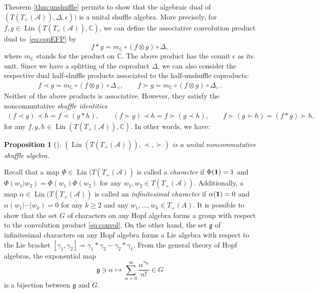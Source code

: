 \documentclass[11pt]{article}
\numberwithin{equation}{section}
\numberwithin{equation}{section}
\newtheorem{Proposition}[Theorem]{Proposition}
 { \theoremstyle{definition}
\newtheorem{Definition}[Theorem]{Definition}
\newtheorem{Example}[Theorem]{Example}
\newtheorem{Remark}[Theorem]{Remark} }
\newcommand{\g}{\mathfrak{g}}
\newcommand{\A}{\mathcal{A}}
\newcommand{\uno}{{\bf{1}}}
\begin{document}
Theorem \ref{thm:unshuffle} permits to show that the algebraic dual of $(T(T_+(\A)),\Delta,\epsilon))$ is a unital shuffle algebra. More precisely, for $f,g\in \operatorname{Lin}(T(T_+(\A)),\mathbb{C})$, we can define the associative convolution product dual to~\eqref{eq:copEFP} by
\begin{equation}\label{eq:convol}
	f*g = m_{\mathbb{C}}\circ (f\otimes g)\circ \Delta,
\end{equation}
where $m_{\mathbb{C}}$ stands for the product on $\mathbb{C}$. The above product has the counit $\epsilon$ as its unit. Since we have a splitting of the coproduct $\Delta$, we can also consider the respective dual half-shuffle products associated to the half-unshuffle coproducts:
\begin{gather*}
	f\prec g
	= m_{\mathbb{C}}\circ (f\otimes g)\circ \Delta_{\prec},\qquad
	f\succ g
	= m_{\mathbb{C}}\circ (f\otimes g)\circ \Delta_{\succ}.
\end{gather*}
Neither of the above products is associative. However, they satisfy the noncommutative \textit{shuffle identities}
\begin{gather*}
	(f\prec g)\prec h =f\prec (g*h),\qquad\!
	(f\succ g)\prec h = f\succ (g\prec h),\qquad\!
	f\succ (g\succ h) = (f*g)\succ h,
\end{gather*}
for any $f,g,h\in \operatorname{Lin}(T(T_+(\A)),\mathbb{C})$. In other words, we have:
\begin{Proposition}[\cite{EFP1}]
$(\operatorname{Lin}(T(T_+(\A))),\prec,\succ)$ is a unital noncommutative shuffle algebra.
\end{Proposition}

Recall that a map $\Phi \in \operatorname{Lin}(T(T_+(\A))$ is called a \textit{character} if $\Phi(\uno) = 1$ and $\Phi(w_1|w_2) = \Phi(w_1)\Phi(w_2)$ for any $w_1,w_2\in T(T_+(\A))$. Additionally, a map $\alpha \in \operatorname{Lin}(T(T_+(\A))$ is called an \textit{infinitesimal character} if $\alpha({\bf{1}}) = 0$ and $\alpha(w_1|\cdots| w_k) = 0$ for any $k\geq2$ and any $w_1,\dots,w_k \allowbreak \in T_+(A)$. It is possible to show that the set $G$ of characters on any Hopf algebra forms a group with respect to the convolution product \eqref{eq:convol}. On the other hand, the set $\g$ of infinitesimal characters on any Hopf algebra forms a Lie algebra with respect to the Lie bracket $[\gamma_1,\gamma_2] = \gamma_1*\gamma_2 - \gamma_2*\gamma_1$. From the general theory of Hopf algebras, the exponential map
\[
	 \g \ni \alpha \mapsto \sum_{n=0}^\infty \frac{\alpha^{*n}}{n!}\in G
 \]
is a bijection between $\g$ and $G$.
\end{document}
